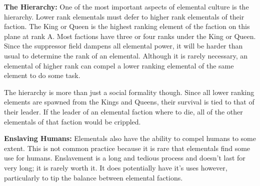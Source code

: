 \documentclass[blue]{elementals}
\begin{document}
{\bf The Hierarchy:}
One of the most important aspects of elemental culture is the hierarchy. Lower rank elementals must defer to higher rank elementals of their faction. The King or Queen is the highest ranking element of the faction on this plane at rank A. Most factions have three or four ranks under the King or Queen.  Since the suppressor field dampens all elemental power, it will be harder than usual to determine the rank of an elemental. Although it is rarely necessary, an elemental of higher rank can compel a lower ranking elemental of the same element to do some task.

The hierarchy is more than just a social formality though. Since all lower ranking elements are spawned from the Kings and Queens, their survival is tied to that of their leader. If the leader of an elemental faction where to die, all of the other elementals of that faction would be crippled.

{\bf Enslaving Humans:}
Elementals also have the ability to compel humans to some extent. This is not common practice because it is rare that elementals find some use for humans. Enslavement is a long and tedious process and doesn't last for very long; it is rarely worth it. It does potentially have it's uses however, particularly to tip the balance between elemental factions.
\end{document}
